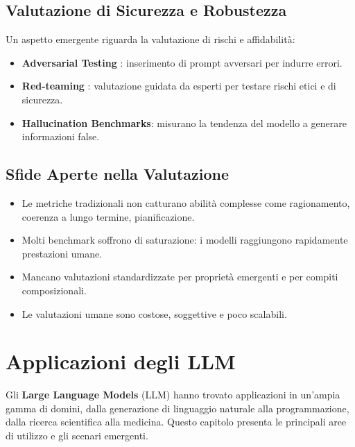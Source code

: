 \subsection{Valutazione di Sicurezza e Robustezza}
Un aspetto emergente riguarda la valutazione di rischi e affidabilità:
\begin{itemize}
    \item \textbf{Adversarial Testing} \cite{wei2023jailbroken}\cite{ganguli2022redteaming}\cite{casper2023explore}\cite{perez2022redwithlm}: inserimento di prompt avversari per indurre errori.
    \item \textbf{Red-teaming} \cite{wei2023jailbroken}\cite{ganguli2022redteaming}\cite{casper2023explore}\cite{perez2022redwithlm}: valutazione guidata da esperti per testare rischi etici e di sicurezza.
    \item \textbf{Hallucination Benchmarks}: misurano la tendenza del modello a generare informazioni false.
\end{itemize}

\subsection{Sfide Aperte nella Valutazione}
\begin{itemize}
    \item Le metriche tradizionali non catturano abilità complesse come ragionamento, coerenza a lungo termine, pianificazione.
    \item Molti benchmark soffrono di saturazione: i modelli raggiungono rapidamente prestazioni umane.
    \item Mancano valutazioni standardizzate per proprietà emergenti e per compiti composizionali.
    \item Le valutazioni umane sono costose, soggettive e poco scalabili.
\end{itemize}

\newpage
\section{Applicazioni degli LLM}

Gli \textbf{Large Language Models} (LLM) hanno trovato applicazioni in un'ampia gamma di domini, 
dalla generazione di linguaggio naturale alla programmazione, 
dalla ricerca scientifica alla medicina. 
Questo capitolo presenta le principali aree di utilizzo e gli scenari emergenti.

